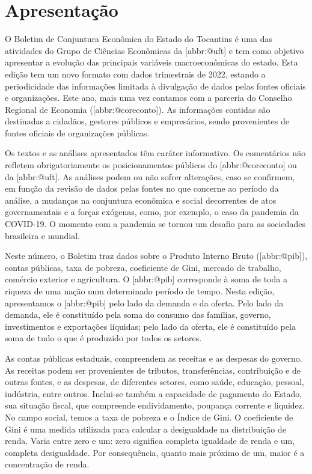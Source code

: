 \documentclass[
]{article}
\author{}
\date{\vspace{-2.5em}}
\begin{document}
\section*{Apresentação}\label{apresentauxe7uxe3o}

\begin{center}

\begin{minipage}{.7\linewidth}
O Boletim de Conjuntura Econômica do Estado do Tocantins é uma das
atividades do Grupo  de Ciências Econômicas da {[}abbr:@uft{]}
e tem como objetivo apresentar a evolução das principais variáveis
macroeconômicas do estado. Esta edição tem um novo formato com dados
trimestrais de 2022, estando a periodicidade das informações limitada à
divulgação de dados pelas fontes oficiais e organizações. Este ano, mais
uma vez contamos com a parceria do Conselho Regional de Economia
({[}abbr:@coreconto{]}). As informações contidas são destinadas a
cidadãos, gestores públicos e empresários, sendo provenientes de fontes
oficiais de organizações públicas.

Os textos e as análises apresentados têm caráter informativo. Os
comentários não refletem obrigatoriamente os posicionamentos públicos do
{[}abbr:@coreconto{]} ou da {[}abbr:@uft{]}. As análises podem ou não
sofrer alterações, caso se confirmem, em função da revisão de dados
pelas fontes no que concerne ao período da análise, a mudanças na
conjuntura econômica e social decorrentes de atos governamentais e a
forças exógenas, como, por exemplo, o caso da pandemia da COVID-19. O
momento com a pandemia se tornou um desafio para as sociedades
brasileira e mundial.

Neste número, o Boletim traz dados sobre o Produto Interno Bruto
({[}abbr:@pib{]}), contas públicas, taxa de pobreza, coeficiente de
Gini, mercado de trabalho, comércio exterior e agricultura. O
{[}abbr:@pib{]} corresponde à soma de toda a riqueza de uma nação num
determinado período de tempo. Nesta edição, apresentamos o
{[}abbr:@pib{]} pelo lado da demanda e da oferta. Pelo lado da demanda,
ele é constituído pela soma do consumo das famílias, governo,
investimentos e exportações líquidas; pelo lado da oferta, ele é
constituído pela soma de tudo o que é produzido por todos os setores.

As contas públicas estaduais, compreendem as receitas e as despesas do
governo. As receitas podem ser provenientes de tributos, transferências,
contribuição e de outras fontes, e as despesas, de diferentes setores,
como saúde, educação, pessoal, indústria, entre outros. Inclui-se também
a capacidade de pagamento do Estado, sua situação fiscal, que compreende
endividamento, poupança corrente e liquidez. No campo social, temos a
taxa de pobreza e o Índice de Gini. O coeficiente de Gini é uma medida
utilizada para calcular a desigualdade na distribuição de renda. Varia
entre zero e um: zero significa completa igualdade de renda e um,
completa desigualdade. Por consequência, quanto mais próximo de um,
maior é a concentração de renda.


\end{minipage}
\end{center}
\end{document}

